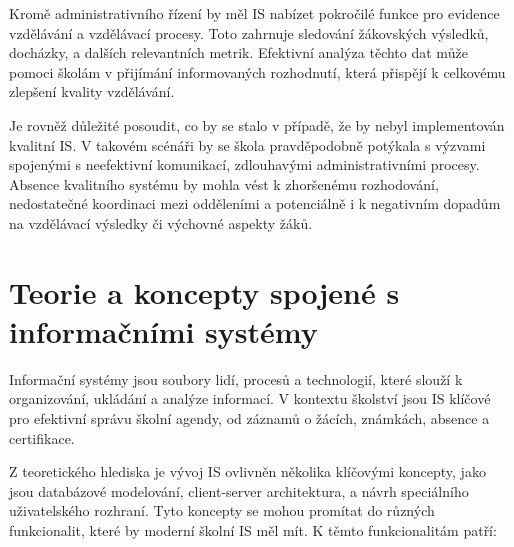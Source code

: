 \documentclass[FM,Proj]{tulthesis}
\begin{document}
Kromě administrativního řízení by měl IS nabízet 
pokročilé funkce pro evidence vzdělávání a vzdělávací procesy. 
Toto zahrnuje sledování žákovských výsledků, docházky, a dalších 
relevantních metrik. Efektivní analýza těchto dat může pomoci školám 
v přijímání informovaných rozhodnutí, která přispějí k celkovému 
zlepšení kvality vzdělávání.

Je rovněž důležité posoudit, co by se stalo v případě, že by nebyl 
implementován kvalitní IS. V takovém scénáři by se 
škola pravděpodobně potýkala s výzvami spojenými s neefektivní 
komunikací, zdlouhavými administrativními procesy. Absence kvalitního 
systému by mohla vést k zhoršenému rozhodování, nedostatečné 
koordinaci mezi odděleními a potenciálně i k negativním dopadům 
na vzdělávací výsledky či výchovné aspekty žáků.

\section{Teorie a koncepty spojené s informačními systémy}
Informační systémy jsou soubory lidí, procesů a technologií, které slouží k
organizování, ukládání a analýze informací. V kontextu školství jsou
IS klíčové pro efektivní správu školní agendy, od záznamů o žácích, 
známkách, absence a certifikace.

Z teoretického hlediska je vývoj IS ovlivněn několika klíčovými
koncepty, jako jsou databázové modelování, client-server architektura, a návrh speciálního
uživatelského rozhraní. Tyto koncepty se mohou promítat do různých funkcionalit, 
které by moderní školní IS měl mít. K těmto funkcionalitám patří:
\end{document}
